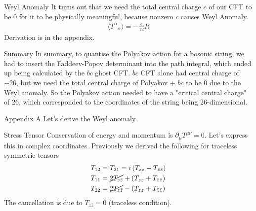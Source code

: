 \documentclass{beamer}
\begin{document}
\begin{frame}{Weyl Anomaly}
    It turns out that we need the total central charge $c$ of our CFT to be 0 for it to be physically meaningful, because nonzero $c$ causes Weyl Anomaly.
    \begin{align}
        \langle {T^\alpha}_\alpha \rangle = -\frac{c}{12} R
    \end{align}
    Derivation is in the appendix. 
\end{frame}
\begin{frame}{Summary}
    In summary, to quantise the Polyakov action for a bosonic string, we had to insert the Faddeev-Popov determinant into the path integral, which ended up being calculated by the $bc$ ghost CFT. $bc$ CFT alone had central charge of $-26$, but we need the total central charge of Polyakov + $bc$ to be $0$ due to the Weyl anomaly. So the Polyakov action needed to have a "critical central charge" of 26, which corresponded to the coordinates of the string being 26-dimensional. 
\end{frame}
\begin{frame}{Appendix A}
    Let's derive the Weyl anomaly.
\end{frame}
\begin{frame}{Stress Tensor}
    Conservation of energy and momentum is $\partial_\mu T^{\mu \nu} = 0$. Let's express this in complex coordinates. Previously we derived the following for traceless symmetric tensors
    \begin{align}
& T_{12}=T_{21}=i\left(T_{z z}-T_{\bar{z} \bar{z}}\right) \\
& T_{11}=\cancel{2 T_{z \bar{z}}}+\left(T_{z z}+T_{\bar{z} \bar{z}}\right) \\
& T_{22}=\cancel{2 T_{z \bar{z}}}-\left(T_{z z}+T_{\bar{z} \bar{z}}\right)
    \end{align}
    The cancellation is due to $T_{z\bar{z}}=0$ (traceless condition).
\end{frame}
\end{document}
